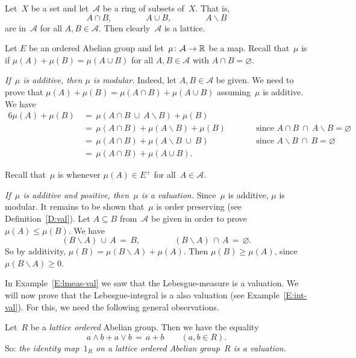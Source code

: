 \documentclass[main.tex]{subfiles}
\begin{document}
\begin{ex}
\label{E:ring-val}
Let~$X$ be a set and let~$\mathcal{A}$ be a ring of subsets of~$X$.
That is,
\begin{equation*}
A\cap B,\qquad\qquad A\cup B,\qquad\qquad A\backslash B
\end{equation*}
are in~$\mathcal{A}$ for all $A,B\in\mathcal{A}$.
Then clearly~$\mathcal{A}$ is a lattice.

Let $E$ be an ordered Abelian group
and let~$\mu\colon \mathcal{A}\rightarrow \mathbb{R}$ be a map.
Recall that~$\mu$ is  if $\mu(A) + \mu(B) = \mu(A\cup B)$
for all $A,B\in\mathcal{A}$ with $A\cap B=\varnothing$.

\emph{If~$\mu$ is additive,
then $\mu$ is modular.}
Indeed,
let $A,B\in \mathcal{A}$ be given. We need to prove that
$\mu(A) + \mu(B) =\mu(A\cap B) + \mu(A\cup B)$
assuming~$\mu$ is additive.
We have
\begin{alignat*}{6}
\mu(A) + \mu(B) \,
  & =\, \mu(A\cap B \ \cup\ A\backslash B) + \mu(B) \\ 
  & =\, \mu(A\cap B) + \mu(A\backslash B)  + \mu(B)\qquad
    && \text{since } A\cap B \ \cap\ A\backslash B = \varnothing \\ 
  & =\, \mu(A\cap B) + \mu(A\backslash B \ \cup\ B ) 
    && \text{since } A\backslash B\ \cap\ B = \varnothing \\
  & =\, \mu(A\cap B) + \mu(A\cup B).
\end{alignat*}

Recall that~$\mu$ is  whenever
$\mu(A)\in E^+$ for all~$A\in\mathcal{A}$.

\emph{If~$\mu$ is additive and positive,
then~$\mu$ is a valuation.}
Since~$\mu$ is additive,
$\mu$ is modular.
It remains to be shown that~$\mu$ is order preserving
(see Definition~\ref{D:val}).
Let $A\subseteq B$ from~$\mathcal{A}$ be given
in order to prove $\mu(A)\leq \mu(B)$.
We have
\begin{equation*}
(B\backslash A)\,\cup\, A\,=\,B,\qquad\qquad 
(B\backslash A)\,\cap\, A\,=\,\varnothing.
\end{equation*}
So by additivity, 
$\mu(B)=\mu(B\backslash A)+\mu(A)$.
Then $\mu(B)\geq \mu(A)$, since $\mu(B\backslash A)\geq 0$.
\end{ex}

In Example~\ref{E:lmeas-val}
we saw that the Lebesgue-measure is a valuation.
We will now prove that the Lebesgue-integral is a also valuation
(see Example~\ref{E:int-val}).
For this,
we need the following general observations.
\begin{ex}
\label{E:1-valuation}
Let~$R$ be a \emph{lattice ordered} Abelian group.
Then we have the equality
\begin{equation*}
a\wedge b  + a\vee b \,=\, a+b \qquad(a,b\in R).
\end{equation*}
So: \emph{the identity map~$1_R$
on a lattice ordered Abelian group~$R$ is a valuation}.
\end{ex}
\end{document}
